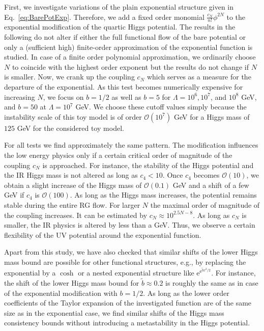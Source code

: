 \documentclass[twocolumn,aps,prd,showpacs,nofootinbib,superscriptaddress,preprintnumbers,floatfix,10pt]{revtex4-1}
\newcommand{\E}{\mathrm{e}}
\begin{document}
First, we investigate variations of the plain exponential structure given in Eq.~\eqref{eq:BarePotExp}. Therefore, we add a fixed order monomial $\frac{c_{N}}{n!}\phi^{2N}$ to the exponential modification of the quartic Higgs potential. The results in the following do not alter if either the full functional flow of the bare potential or only a (sufficient high) finite-order approximation of the exponential function is studied. In case of a finite order polynomial approximation, we ordinarily choose $N$ to coincide with the highest order exponent but the results do not change if $N$ is smaller. Now, we crank up the coupling $c_{N}$ which serves as a measure for the departure of the exponential. As this test becomes numerically expensive for increasing $N$, we focus on $b=1/2$ as well as $b=5$ for $\Lambda=10^{6}, 10^{7}$, and $10^{8}$ GeV, and $b=50$ at $\Lambda=10^{7}$ GeV. We choose these cutoff values simply because the instability scale of this toy model is of order $\mathcal{O}(10^{7})$ GeV for a Higgs mass of $125$ GeV for the considered toy model. 

For all tests we find approximately the same pattern. The modification influences the low energy physics only if a certain critical order of magnitude of the coupling $c_{N}$ is approached. For instance, the stability of the Higgs potential and the IR Higgs mass is not altered as long as $c_{4}<10$. Once $c_{4}$ becomes $\mathcal{O}(10)$, we obtain a slight increase of the Higgs mass of $\mathcal{O}(0.1)$ GeV and a shift of a few GeV if $c_{4}$ is $\mathcal{O}(100)$. As long as the Higgs mass increases, the potential remains stable during the entire RG flow. For larger $N$ the maximal order of magnitude of the coupling increases. It can be estimated by $c_{N} \approx 10^{2.5N-8}$. As long as $c_{N}$ is smaller, the IR physics is altered by less than a GeV. Thus, we observe a certain flexibility of the UV potential around the exponential function.

Apart from this study, we have also checked that similar shifts of the lower Higgs mass bound are possible for other functional structures, e.g., by replacing the exponential by a $\cosh$ or a nested exponential structure like $\E^{\E^{\tilde{b} x^{2}/2}}$. 
For instance, the shift of the lower Higgs mass bound for $\tilde b \approx 0.2$ is roughly the same as in case of the exponential modification with $b=1/2$. 
As long as the lower order coefficients of the Taylor expansion of the investigated function are of the same size as in the exponential case, we find similar shifts of the Higgs mass consistency bounds without introducing a metastability in the Higgs potential. 
\end{document}
